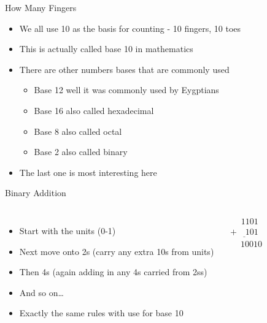 \documentclass{beamer}
\begin{document}
\begin{frame}{How Many Fingers}
  \begin{itemize}
  \item
    We all use 10 as the basis for counting - 10 fingers, 10 toes
  \item
    This is actually called base 10 in mathematics
  \item
    There are other numbers bases that are commonly used
    \begin{itemize}
    \item
      Base 12 well it was commonly used by Eygptians 
    \item
      Base 16 also called hexadecimal
    \item
      Base 8 also called octal
    \item
      Base 2 also called binary
    \end{itemize}
  \item
    The last one is most interesting here
  \end{itemize}
\end{frame}


\begin{frame}{Binary Addition}
  \begin{columns}
    \begin{itemize}
    \item
      Start with the units (0-1) 
    \item
      Next move onto 2s (carry any extra 10s from units)
    \item
      Then 4s (again adding in any 4s carried from 2ss)
    \item
      And so on\dots
    \item
      Exactly the same rules with use for base 10
    \end{itemize}

    \begin{equation*}
      \begin{array}{c}
        \phantom{+9}1101\\
        \underline{+\phantom{99}101}\\
        \phantom{+}10010\\
      \end{array}
    \end{equation*}
  \end{columns}
  
\end{frame}
\end{document}
